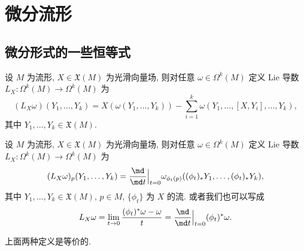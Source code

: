 \chapter{微分流形}
    \section{微分形式的一些恒等式}
    \begin{definition}
        设 $M$ 为流形, $X\in\mathfrak{X}(M)$ 为光滑向量场, 
        则对任意 $\omega\in\Omega^k(M)$ 定义 Lie 导数 $L_X:\Omega^k(M)\rightarrow\Omega^k(M)$ 为
        \begin{equation*}
            (L_X\omega)(Y_1,\dots,Y_k) = X(\omega(Y_1,\dots,Y_k))
            - \sum_{i=1}^{k}\omega(Y_1,\dots,[X,Y_i],\dots,Y_k),
        \end{equation*}
        其中 $Y_1,\dots,Y_k\in\mathfrak{X}(M)$.
    \end{definition}
    \begin{definition}
        设 $M$ 为流形, $X\in\mathfrak{X}(M)$ 为光滑向量场, 
        则对任意 $\omega\in\Omega^k(M)$ 定义 Lie 导数 $L_X:\Omega^k(M)\rightarrow\Omega^k(M)$ 为
        \begin{equation*}
            (L_X\omega)_{p}(Y_1,\dots,Y_k) = \frac{\md}{\md t}\Big|_{t=0}\omega_{\phi_t(p)}((\phi_t)_*Y_1,\dots,(\phi_t)_*Y_k),
        \end{equation*}
        其中 $Y_1,\dots,Y_k\in\mathfrak{X}(M)$, $p\in M$, $\{\phi_t\}$ 为 $X$ 的流.
        或者我们也可以写成
        \begin{equation*}
            L_X\omega = \lim_{t\rightarrow 0}\frac{(\phi_t)^*\omega - \omega}{t} 
            = \frac{\md}{\md t}\Big|_{t=0}(\phi_t)^*\omega.
        \end{equation*}
    \end{definition}
    \begin{proposition}
        上面两种定义是等价的.
    \end{proposition}
    \newpage
